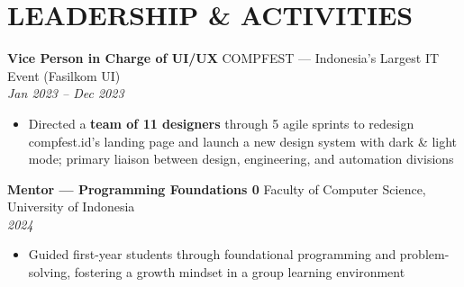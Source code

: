 \documentclass[10pt,a4paper]{article}
\newcommand{\experienceheader}[4]{
    \textbf{#1} \hfill #2 \\
    \textit{#3} \hfill \textit{#4}
}
\begin{document}
\section*{LEADERSHIP \& ACTIVITIES}

\experienceheader{Vice Person in Charge of UI/UX}{COMPFEST --- Indonesia's Largest IT Event (Fasilkom UI)}{}{Jan 2023 -- Dec 2023}
\begin{itemize}[leftmargin=*, itemsep=0.5pt, topsep=1pt]
    \item Directed a \textbf{team of 11 designers} through 5 agile sprints to redesign compfest.id's landing page and launch a new design system with dark \& light mode; primary liaison between design, engineering, and automation divisions
\end{itemize}

\vspace{2pt}

\experienceheader{Mentor --- Programming Foundations 0}{Faculty of Computer Science, University of Indonesia}{}{2024}
\begin{itemize}[leftmargin=*, itemsep=0.5pt, topsep=1pt]
    \item Guided first-year students through foundational programming and problem-solving, fostering a growth mindset in a group learning environment
\end{itemize}
\end{document}
